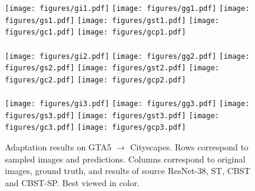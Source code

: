 \documentclass[runningheads]{llncs}
\begin{document}
\begin{figure}[!t]
\centering
{}
\vspace{0.2mm}

\texttt{[image: figures/gi1.pdf]}
\texttt{[image: figures/gg1.pdf]}
\texttt{[image: figures/gs1.pdf]}
\texttt{[image: figures/gst1.pdf]}
\texttt{[image: figures/gc1.pdf]}
\texttt{[image: figures/gcp1.pdf]}\\
\quad\\\vspace{-0.325cm}
\texttt{[image: figures/gi2.pdf]}
\texttt{[image: figures/gg2.pdf]}
\texttt{[image: figures/gs2.pdf]}
\texttt{[image: figures/gst2.pdf]}
\texttt{[image: figures/gc2.pdf]}
\texttt{[image: figures/gcp2.pdf]}\\
\quad\\\vspace{-0.325cm}
\texttt{[image: figures/gi3.pdf]}
\texttt{[image: figures/gg3.pdf]}
\texttt{[image: figures/gs3.pdf]}
\texttt{[image: figures/gst3.pdf]}
\texttt{[image: figures/gc3.pdf]}
\texttt{[image: figures/gcp3.pdf]}
\caption{Adaptation results on GTA5 $\rightarrow$ Cityscapes. Rows correspond to sampled images and predictions. Columns correspond to original images, ground truth, and results of source ResNet-38, ST, CBST and CBST-SP. Best viewed in color.}\label{gta2city}
\end{figure}
\end{document}
